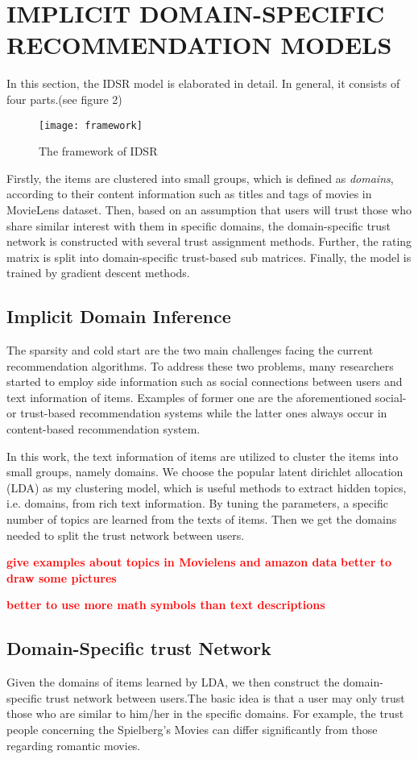\section{IMPLICIT DOMAIN-SPECIFIC RECOMMENDATION MODELS}
In this section, the IDSR model is elaborated in detail. In general, it consists of four parts.(see figure 2)
\begin{figure}[h]
	\caption{The framework of IDSR}
	\centering
	\texttt{[image: framework]}
\end{figure}
Firstly, the items are clustered into small groups, which is defined as \emph{domains}, according to their content information such as titles and tags of movies in MovieLens dataset. Then, based on an assumption that users will trust those who share similar interest with them in specific domains, the domain-specific trust network is constructed with several trust assignment methods. Further, the rating matrix is split into domain-specific trust-based sub matrices. Finally, the model is trained by gradient descent methods.
\subsection{Implicit Domain Inference}
The sparsity and cold start are the two main challenges facing the current recommendation algorithms. To address these two problems, many researchers started to employ side information such as social connections between users and text information of items. Examples of former one are the aforementioned social- or trust-based recommendation systems while the latter ones always occur in content-based recommendation system.

In this work, the text information of items are utilized to cluster the items into small groups, namely domains. We choose the popular latent dirichlet allocation (LDA)\cite{blei2003latent} as my clustering model, which is useful methods to extract hidden topics, i.e. domains, from rich text information. By tuning the parameters, a specific number of topics are learned from the texts of items. Then we get the domains needed to split the trust network between users.

\textcolor{red}{\textbf{give examples about topics in Movielens and amazon data}}
\textcolor{red}{\textbf{better to draw some pictures}}

\textcolor{red}{\textbf{better to use more math symbols than text descriptions}}

\subsection{Domain-Specific trust Network}
Given the domains of items learned by LDA, we then construct the domain-specific trust network between users.The basic idea is that a user may only trust those who are similar to him/her in the specific domains. For example, the trust people concerning the Spielberg's Movies can differ significantly from those regarding romantic movies.

